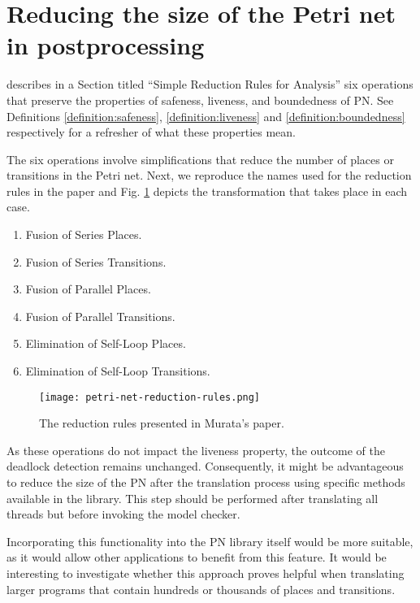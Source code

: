 \section{Reducing the size of the Petri net in postprocessing}
\label{sec:future-work-petri-net-reduction}

\cite{murata1989} describes in a Section titled ``Simple Reduction Rules for Analysis''
six operations that preserve the properties of safeness, liveness, and boundedness of \acrshort{PN}.
See Definitions \ref{definition:safeness}, \ref{definition:liveness} and \ref{definition:boundedness}
respectively for a refresher of what these properties mean.

The six operations involve simplifications that reduce the number of places or transitions
in the Petri net. Next, we reproduce the names used for the reduction rules in the paper and
Fig. \ref{fig:petri-net-reduction-rules} depicts the transformation that takes place in each case.

\begin{enumerate}[label={\alph*)}]
  \item Fusion of Series Places.
  \item Fusion of Series Transitions.
  \item Fusion of Parallel Places.
  \item Fusion of Parallel Transitions.
  \item Elimination of Self-Loop Places.
  \item Elimination of Self-Loop Transitions.
\end{enumerate}

\begin{figure}[!htb]
  \centering
  \texttt{[image: petri-net-reduction-rules.png]}
  \caption{The reduction rules presented in Murata's paper.}
  \label{fig:petri-net-reduction-rules}
\end{figure}

As these operations do not impact the liveness property,
the outcome of the deadlock detection remains unchanged.
Consequently, it might be advantageous to reduce the size of the \acrshort{PN}
after the translation process using specific methods available in the  library.
This step should be performed after translating all threads but before invoking the model checker.

Incorporating this functionality into the \acrshort{PN} library itself would be more suitable,
as it would allow other applications to benefit from this feature.
It would be interesting to investigate whether
this approach proves helpful when translating larger programs
that contain hundreds or thousands of places and transitions.

